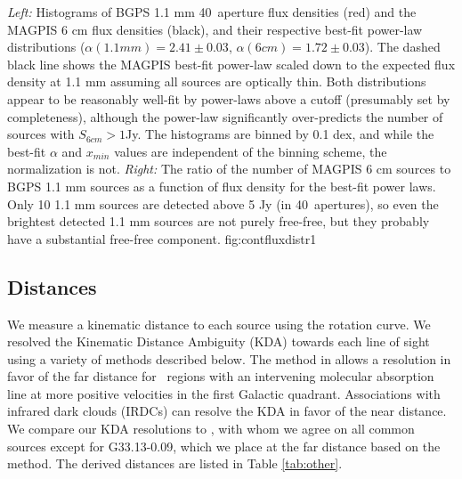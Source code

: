 {{\it Left:} Histograms of BGPS 1.1 mm 40\arcsec\ aperture flux densities (red)
and the MAGPIS 6 cm flux densities (black), and their respective best-fit
power-law distributions ($\alpha(1.1 mm)=2.41\pm0.03$, $\alpha(6
cm)=1.72\pm0.03$).  The dashed black line shows the MAGPIS best-fit power-law
scaled down to the expected flux density at 1.1 mm assuming all sources are
optically thin.  Both distributions appear to be reasonably well-fit by
power-laws above a cutoff (presumably set by completeness), although the power-law
significantly over-predicts the number of sources with $S_{6 cm}>1$Jy.  The
histograms are binned by 0.1 dex, and while the best-fit $\alpha$ and $x_{min}$
values are independent of the binning scheme, the normalization is not.
{\it Right:} The ratio of the number of MAGPIS 6 cm sources to BGPS 1.1 mm
sources as a function of flux density for the best-fit power laws.  Only 10 1.1
mm sources are detected above 5 Jy (in 40\arcsec\ apertures), so even the
brightest detected 1.1 mm sources are not purely free-free, but they probably 
have a substantial free-free component.}
{fig:contfluxdistr}{1}

\subsection{Distances}
\label{sec:distances}
We measure a kinematic distance to each source using the \citet{Reid2009}
rotation curve.  We resolved the Kinematic Distance Ambiguity (KDA) towards
each line of sight using a variety of methods described below.  The method
in \citet{Sewilo2004} allows a resolution in favor of the far
distance for \uchii\ regions with an intervening molecular absorption line at
more positive velocities in the first Galactic quadrant.  Associations with
infrared dark clouds (IRDCs) can resolve the KDA in favor of the near distance.
We compare our KDA resolutions to \citet{Anderson2009}, with whom we agree on
all common sources except for G33.13-0.09, which we place at the far distance
based on the \citet{Sewilo2004} method.  The derived distances are listed in
Table
\ref{tab:other}.



